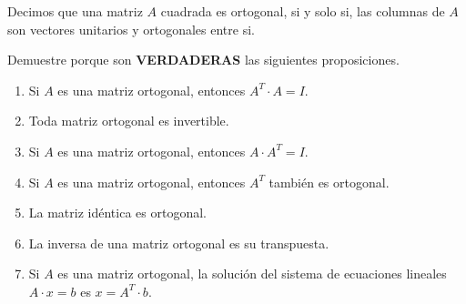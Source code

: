 \begin{definition}
    Decimos que una matriz \(A\) cuadrada es ortogonal, si y solo si, las columnas de \(A\) son vectores unitarios y ortogonales entre si.
\end{definition}
\item Demuestre porque son \textbf{VERDADERAS} las siguientes proposiciones.
    \begin{enumerate}[label=\listAlph]
        \item Si \(A\) es una matriz ortogonal, entonces \(A^{T} \cdot A = I\).
        \item Toda matriz ortogonal es invertible. 
        \item Si \(A\) es una matriz ortogonal, entonces \(A \cdot A^{T} = I\).
        \item Si \(A\) es una matriz ortogonal, entonces \(A^{T}\) también es ortogonal.
        \item La matriz idéntica es ortogonal.
        \item La inversa de una matriz ortogonal es su transpuesta.
        \item Si \(A\) es una matriz ortogonal, la solución del sistema de ecuaciones lineales \(A \cdot x = b\) es \(x = A^{T} \cdot b\).
    \end{enumerate}
